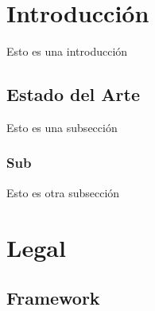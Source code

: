 \documentclass[letterpaper, 12pt]{article}
\begin{document}





\section{Introducción}
Esto es una introducción
\subsection{Estado del Arte}
Esto es una subsección
\subsubsection{Sub}
Esto es otra subsección
\section{Legal}
\subsection{Framework}

	

\clearpage



\end{document}
